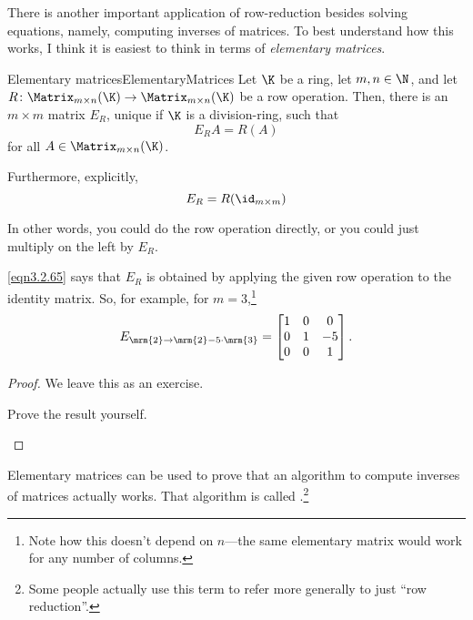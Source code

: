 There is another important application of row-reduction besides solving equations, namely, computing inverses of matrices.  To best understand how this works, I think it is easiest to think in terms of \emph{elementary matrices}.
\begin{thm}{Elementary matrices}{ElementaryMatrices}
	Let $\K$ be a ring, let $m,n\in \N$, and let $R\colon \Matrix _{m\times n}(\K )\rightarrow \Matrix _{m\times n}(\K )$ be a row operation.  Then, there is an $m\times m$ matrix $E_R$, unique if $\K$ is a division-ring, such that
	\begin{equation}
		E_RA=R(A)
	\end{equation}
	for all $A\in \Matrix _{m\times n}(\K )$.
	
	Furthermore, explicitly,
	\begin{equation}\label{eqn3.2.65}
		E_R=R(\id _{m\times m})
	\end{equation}
	\begin{rmk}
		In other words, you could do the row operation directly, or you could just multiply on the left by $E_R$.
	\end{rmk}
	\begin{rmk}
		\eqref{eqn3.2.65} says that $E_R$ is obtained by applying the given row operation to the identity matrix.  So, for example, for $m=3$,\footnote{Note how this doesn't depend on $n$---the same elementary matrix would work for any number of columns.}
		\begin{equation}
			E_{\mrm{2}\rightarrow \mrm{2}-5\cdot \mrm{3}}=\begin{bmatrix}1 & 0 & 0 \\ 0 & 1 & -5 \\ 0 & 0 & 1\end{bmatrix}.
		\end{equation}
	\end{rmk}
	\begin{proof}
		We leave this as an exercise.
		\begin{exr}[breakable=false]{}{}
			Prove the result yourself.
		\end{exr}
	\end{proof}
\end{thm}
Elementary matrices can be used to prove that an algorithm to compute inverses of matrices actually works.  That algorithm is called .\footnote{Some people actually use this term to refer more generally to just ``row reduction''.}
